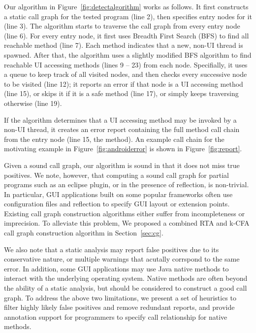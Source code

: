 Our algorithm in Figure~\ref{fig:detectalgorithm} works as follows. It
first constructs a static call graph for the tested program (line 2),
then specifies entry nodes for it (line 3). The algorithm starts to traverse
the call graph from every entry node (line 6). For every entry node,
it first uses Breadth First Search (BFS) to find all reachable
 method (line 7). Each  method
indicates that a new, non-UI thread is spawned.  After that, 
the algorithm uses a slightly modified 
BFS algorithm to find reachable UI accessing methods (lines 9 -- 23)
from each  node.
Specifially, it uses a queue to keep track of all visited nodes, and
then checks every successive node to be visited (line 12);
it reports an error if that node
is a UI accessing method (line 15), or skips it if it is
a safe method (line 17), or simply keeps traversing otherwise (line 19).

If the algorithm determines that a UI accessing method may be invoked
by a non-UI thread, it creates an error report containing the full
method call chain from the entry node (line 15, the 
method). An example call chain for
the motivating example in Figure~\ref{fig:androiderror} is shown
in Figure~\ref{fig:report}.

Given a sound call graph, our algorithm is sound in that it does not
miss true positives. We note, however, that computing a sound
call graph for partial programs such as an eclipse plugin,
or in the presence of reflection, is non-trivial. 
In particular, GUI applications built on some popular frameworks
often use configuration files and reflection to specify GUI layout
or extension points.
Existing call graph construction algorithms either suffer from incompleteness
or imprecision.  To alleviate this problem, 
We proposed a combined RTA
and k-CFA call graph construction algorithm in Section~\ref{sec:cg}.


We also note that a static analysis may report false positives due
to its conservative nature, or multiple warnings that acutally corrspond to
the same error. In addition, some GUI applications may use
Java native methods to interact with the underlying operating system.
Native methods are often beyond the ability of a static analysis, but
should be considered to construct a good call graph. To address the
above two limitations, we present a set of heuristics to filter
highly likely false positives and remove redundant reports, and provide
annotation support for programmers to specify call relationship for
 native methods.


